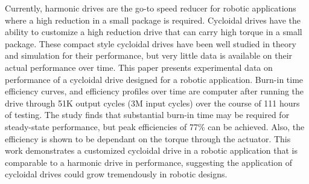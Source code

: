 Currently, harmonic drives are the go-to speed reducer for robotic applications where a high reduction in a small package is required. 
Cycloidal drives have the ability to customize a high reduction drive that can carry high torque in a small package. 
These compact style cycloidal drives have been well studied in theory and simulation for their performance, but very little data is available on their actual performance over time. 
This paper presents experimental data on performance of a cycloidal drive designed for a robotic application. 
Burn-in time efficiency curves, and efficiency profiles over time are computer after running the drive through 51K output cycles (3M input cycles) over the course of 111 hours of testing. 
The study finds that substantial burn-in time may be required for steady-state performance, but peak efficiencies of 77\% can be achieved. 
Also, the efficiency is shown to be dependant on the torque through the actuator.
This work demonstrates a customized cycloidal drive in a robotic application that is comparable to a harmonic drive in performance, suggesting the application of cycloidal drives could grow tremendously in robotic designs. 